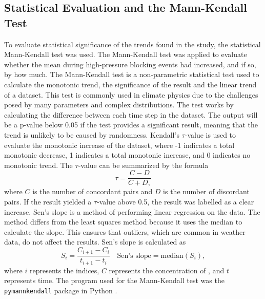 \subsection{Statistical Evaluation and the Mann-Kendall Test}
To evaluate statistical significance of the trends found in the study, the statistical Mann-Kendall test was used. The Mann-Kendall test was applied to evaluate whether the \PM mean during high-pressure blocking events had increased, and if so, by how much. The Mann-Kendall test is a non-parametric statistical test used to calculate the monotonic trend, the significance of the result and the linear trend of a dataset. This test is commonly used in climate physics due to the challenges posed by many parameters and complex distributions. The test works by calculating the difference between each time step in the dataset. The output will be a p-value below 0.05 if the test provides a significant result, meaning that the trend is unlikely to be caused by randomness. Kendall's $\tau$-value is used to evaluate the monotonic increase of the dataset, where -1 indicates a total monotonic decrease, 1 indicates a total monotonic increase, and 0 indicates no monotonic trend. The $\tau$-value can be summarized by the formula 
\begin{equation}
    \tau = \frac{C - D}{C + D,}
    \label{eq:Kendalltau}
\end{equation}
where $C$ is the number of concordant pairs and $D$ is the number of discordant pairs. If the result yielded a $\tau$-value above 0.5, the result was labelled as a clear increase. Sen's slope is a method of performing linear regression on the data. The method differs from the least squares method because it uses the median to calculate the slope. This ensures that outliers, which are common in weather data, do not affect the results. Sen's slope is calculated as 
\begin{equation}
    S_{i} = \frac{C_{i+1} - C_i}{t_{i+1} - t_i} \quad \text{Sen's slope} = \text{median}(S_{i}),
    \label{eq:Senslope}
\end{equation}
where $i$ represents the indices, $C$ represents the concentration of \PM, and $t$ represents time. The program used for the Mann-Kendall test was the \texttt{pymannkendall} package in Python \cite{hussainmd.PyMannKendallPythonPackage2019}.
